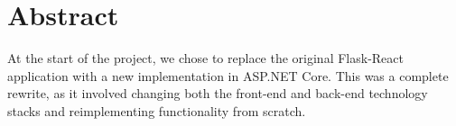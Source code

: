 \documentclass[12pt,a4paper,reqno]{report}
\begin{document}
     
    \clearpage
    \tableofcontents

    \setcounter{page}{0}
    \clearpage 

    \section{Abstract}
    At the start of the project, we chose to replace the original Flask-React application with a new implementation in ASP.NET Core. This was a complete rewrite, as it involved changing both the front-end and back-end technology stacks and reimplementing functionality from scratch.
    \printbibliography[heading=none]
\end{document}
